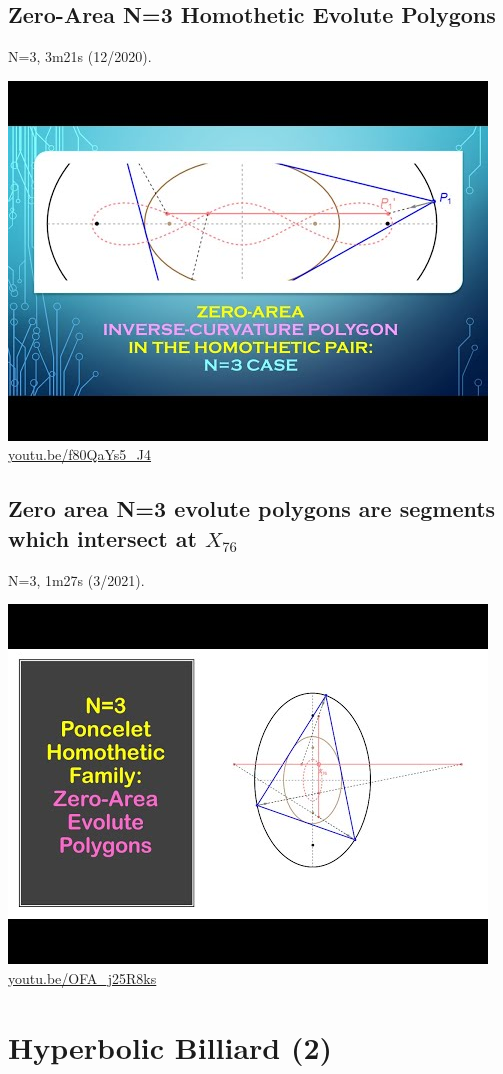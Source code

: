 \documentclass[12pt]{amsart}
\begin{document}
\subsection{Zero-Area N=3 Homothetic Evolute Polygons}
\label{vid:f80QaYs5_J4}
\noindent N=3, 3m21s (12/2020). 
\begin{center}\includegraphics[width=.5\textwidth]{pics/f80QaYs5_J4.jpg} \\ 
\href{https://youtu.be/f80QaYs5_J4}{\url{youtu.be/f80QaYs5\_J4}}\end{center}
% 
\subsection{Zero area N=3 evolute polygons are segments which intersect at $X_{76}$}
\label{vid:OFA_j25R8ks}
\noindent N=3, 1m27s (3/2021). 
\begin{center}\includegraphics[width=.5\textwidth]{pics/OFA_j25R8ks.jpg} \\ 
\href{https://youtu.be/OFA_j25R8ks}{\url{youtu.be/OFA\_j25R8ks}}\end{center}
% 

\section{Hyperbolic Billiard (2)}
\end{document}
